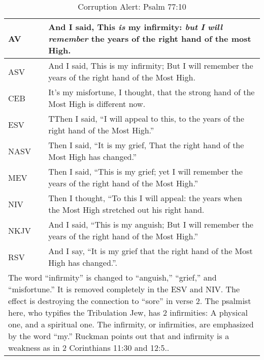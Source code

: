 \begin{center}

\begin{table}[ht]
\centering
\begin{tabular}{|p{.5in}|p{3.5in}|}
\hline

\textcolor[rgb]{0.00,0.00,1.00}{AV} & \textcolor[rgb]{0.00,0.00,1.00}{And I said, This \emph{is} my infirmity: \emph{but} \emph{I} \emph{will} \emph{remember} the years of the right hand of the most High.} \\ \hline 

\hline
\hline


ASV &  And I said, This is my infirmity; But I will remember the years of the right hand of the Most High. \\ \hline
%
CEB &  It’s my misfortune, I thought,  that the strong hand of the Most High is different now.\\ \hline
%
ESV & TThen I said, ``I will appeal to this, to the years of the right hand of the Most High.'' \\ \hline
%
NASV &  Then I said, “It is my grief, That the right hand of the Most High has changed.” \\ \hline
%
MEV & Then I said, “This is my grief;  yet I will remember the years of the right hand of the Most High.” \\ \hline
%
NIV &  Then I thought, “To this I will appeal:  the years when the Most High stretched out his right hand. \\ \hline
%
NKJV &  And I said, “This is my anguish;
But I will remember the years of the right hand of the Most High.”\\ \hline
%
RSV &  And I say, “It is my grief that the right hand of the Most High has changed.”. \\ \hline

\hline
\hline

\multicolumn{2}{|p{4.3in}|}{{\textcolor{jungle}{The word ``infirmity'' is changed to “anguish,” “grief,” and “misfortune.” It is removed completely in the ESV and NIV. The effect is destroying the connection to “sore” in verse 2. The psalmist here, who typifies the Tribulation Jew, has 2 infirmities: A physical one, and a spiritual one. The infirmity, or infirmities, are emphasized by the word ``my.'' Ruckman points out that and infirmity is a weakness as in 2 Corinthians 11:30 and 12:5.\cite{Ruckman1992PsalmsV2}.}}} \\ \hline

\end{tabular}
\caption[Corruption Alert: Psalm 77:10]{Corruption Alert: Psalm 77:10} \label{table:Corruption Psalm 77:10}

\end{table}

\end{center}


